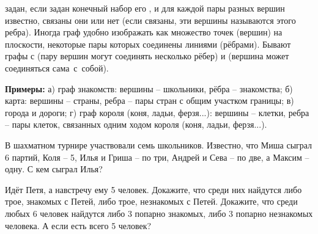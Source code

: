 \documentclass[12pt,a4paper]{article}
\begin{document}



 задан, если задан конечный набор его ,
и для каждой пары разных вершин известно, связаны они 
или нет (если связаны, эти вершины называются  этого ребра). Иногда граф удобно изображать как множество точек (вершин) на плоскости,
некоторые пары которых соединены линиями (рёбрами).
Бывают графы с 
(пару вершин могут соединять несколько рёбер) и  (вершина может соединяться сама~с~собой).


\noindent
{\bf Примеры:} а) граф знакомств: вершины – школьники, рёбра – знакомства;
б) карта: вершины – страны, ребра – пары стран с общим участком границы; в) города и дороги;
г) граф короля (коня, ладьи, ферзя...): вершины – клетки, ребра – пары клеток, связанных одним ходом короля (коня, ладьи, ферзя...).





В шахматном турнире участвовали семь школьников. Известно, что Миша сыграл 6 партий, Коля -- 5, Илья и Гриша -- по три, Андрей и Сева -- по две, а Максим -- одну. С кем сыграл Илья?

Идёт Петя,  а навстречу  ему 5 человек.
Докажите, что среди них найдутся либо трое,
знакомых с Петей, либо трое, незнакомых с Петей.
Докажите, что среди любых 6 человек найдутся
либо 3 попарно знакомых, либо 3 попарно незнакомых человека.
А если есть всего 5 человек?
\end{document}

